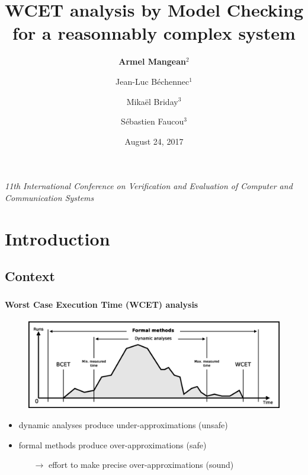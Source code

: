 \documentclass[usenames,dvipsnames]{beamer}
\title{%
  {\bf WCET analysis} by {\bf Model Checking}
  \\ for a {\bf reasonnably complex system}}
\author{%
  {\bf Armel Mangean}$^2$
  \and Jean-Luc Béchennec$^1$
  \and Mikaël Briday$^3$
  \and Sébastien Faucou$^3$}
\institute{%
  $^1$CNRS, $^2$École Centrale de Nantes, $^3$Université de Nantes
  \\ LS2N}
\date{August 24, 2017}
\begin{document}
  \begin{frame}
    \titlepage
    \begin{center}
      \small\emph{11th International Conference on Verification and Evaluation
        of Computer and Communication Systems}
    \end{center}
  \end{frame}

  \begin{frame}
    \tableofcontents
  \end{frame}

  
  \section{Introduction}
  \begin{frame}
    \tableofcontents[currentsection]
  \end{frame}
  
  \subsection{Context}
  \begin{frame}
    \frametitle{\subsecname}
    \framesubtitle{Worst Case Execution Time (WCET) analysis}
    
    \begin{figure}
      \centering
      \includegraphics[width=\textwidth]{fig/wcet}
    \end{figure}


    \begin{itemize}
      \item dynamic analyses produce under-approximations (unsafe)
      \item formal methods produce over-approximations (safe)
      \begin{itemize}
        \item[$\rightarrow$] effort to make precise over-approximations (sound)
      \end{itemize}
    \end{itemize}
  \end{frame}
\end{document}
